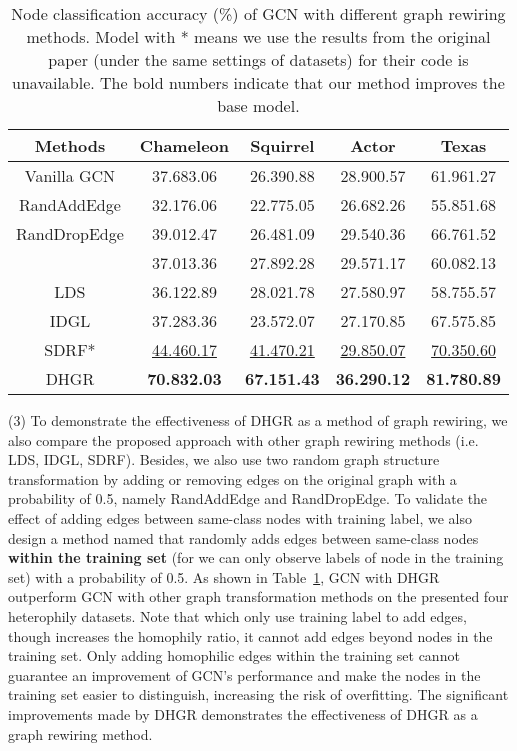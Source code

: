 \documentclass[sigconf]{acmart}
\begin{document}
	\begin{table}
\centering
		\setlength{\tabcolsep}{1pt}
		\caption{Node classification accuracy (\%) of GCN with different graph rewiring methods. Model with * means we use the results from the original paper (under the same settings of datasets) for their code is unavailable.  The bold numbers indicate that our method improves the base model.}
		\label{tab:res_g_trans}
		\begin{tabular}{ccccc}
			\toprule
Methods  & Chameleon & Squirrel & Actor & Texas \\
			\midrule
Vanilla GCN & 37.683.06 & 26.390.88 & 28.900.57 & 61.961.27 \\
			RandAddEdge & 32.176.06 & 22.775.05 & 26.682.26 & 55.851.68 \\
			RandDropEdge & 39.012.47 & 26.481.09 & 29.540.36 &66.761.52 \\
			 & 37.013.36 & 27.892.28 & 29.571.17 & 60.082.13 \\
			LDS & 36.122.89 & 28.021.78 & 27.580.97 & 58.755.57 \\
			IDGL & 37.283.36 & 23.572.07 & 27.170.85 & {67.575.85} \\
			SDRF* & \underline{44.460.17} & \underline{41.470.21} & \underline{29.850.07} & \underline{70.350.60}\\
			DHGR & \textbf{70.832.03} & \textbf{67.151.43} & \textbf{36.290.12} & \textbf{81.780.89} \\
			\bottomrule
		\end{tabular}
	\end{table}
	
	
	
	(3) To demonstrate the effectiveness of DHGR as a method of graph rewiring, we also compare the proposed approach with other graph rewiring methods (i.e. LDS, IDGL, SDRF). Besides, we also use two random graph structure transformation by adding or removing edges on the original graph with a probability of 0.5, namely RandAddEdge and RandDropEdge. To validate the effect of adding edges between same-class nodes with training label, we also design a method named  that randomly adds edges between same-class nodes \textbf{within the training set} (for we can only observe labels of node in the training set) with a probability of 0.5. As shown in Table~\ref{tab:res_g_trans}, GCN with DHGR outperform GCN with other graph transformation methods on the presented four heterophily datasets. Note that  which only use training label to add edges, though increases the homophily ratio, it cannot add edges beyond nodes in the training set. Only adding homophilic edges within the training set cannot guarantee an improvement of GCN's performance and make the nodes in the training set easier to distinguish, increasing the risk of overfitting. The significant improvements made by DHGR demonstrates the effectiveness of DHGR  as a  graph rewiring method. 
	
\end{document}
